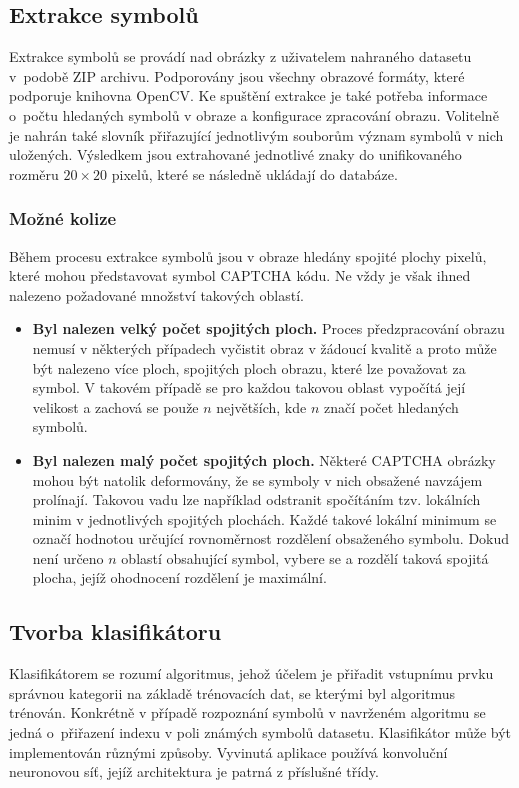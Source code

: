 \documentclass[
  field=ainfp,
  master=true,
  biblatex,
  sourcecodes=false,
  theorems=false,
  glossaries,
  index
]{kidiplom}
\begin{document}
\subsection{Extrakce symbolů}
Extrakce symbolů se provádí nad obrázky z uživatelem nahraného datasetu v~podobě ZIP archivu. Podporovány jsou všechny obrazové formáty, které podporuje knihovna OpenCV. Ke spuštění extrakce je také potřeba informace o~počtu hledaných symbolů v obraze a konfigurace zpracování obrazu. Volitelně je na\-hrán také slovník přiřazující jednotlivým souborům význam symbolů v nich uložených. Výsledkem jsou extrahované jednotlivé znaky do unifikovaného rozměru  $20\times20$ pixelů, které se následně ukládají do databáze.

\subsubsection*{Možné kolize}
Během procesu extrakce symbolů jsou v obraze hledány spojité plochy pixelů, které mohou představovat symbol CAPTCHA kódu. Ne vždy je však ihned nalezeno požadované množství takových oblastí. 
\begin{itemize}
\item \textbf{Byl nalezen velký počet spojitých ploch.} Proces předzpracování ob\-razu nemusí v některých případech vyčistit obraz v žádoucí kvalitě a proto může být nalezeno více ploch, spojitých ploch obrazu, které lze považovat za symbol. V takovém případě se pro každou takovou oblast vypočítá její velikost a zachová se použe $n$ největších, kde $n$ značí počet hledaných symbolů.

\item \textbf{Byl nalezen malý počet spojitých ploch.} Některé CAPTCHA obrázky mohou být natolik deformovány, že se symboly v nich obsažené navzájem prolínají. Takovou vadu lze například odstranit spočítáním tzv. lokálních minim v jednotlivých spojitých plochách. Každé takové lokální minimum se označí hodnotou určující rovnoměrnost rozdělení obsaženého symbolu. Dokud není určeno $n$ oblastí obsahující symbol, vybere se a rozdělí taková spojitá plocha, jejíž ohodnocení rozdělení je maximální.
\end{itemize}


\subsection{Tvorba klasifikátoru}
Klasifikátorem se rozumí algoritmus, jehož účelem je přiřadit vstupnímu prvku správnou kategorii na základě trénovacích dat, se kterými byl algoritmus trénován. Konkrétně v případě rozpoznání symbolů v navrženém algoritmu se jedná o~při\-řazení indexu v poli známých symbolů datasetu. Klasifikátor může být implementován různými způsoby. Vyvinutá aplikace používá konvoluční neuronovou síť, jejíž architektura je patrná z příslušné třídy. 
\end{document}
